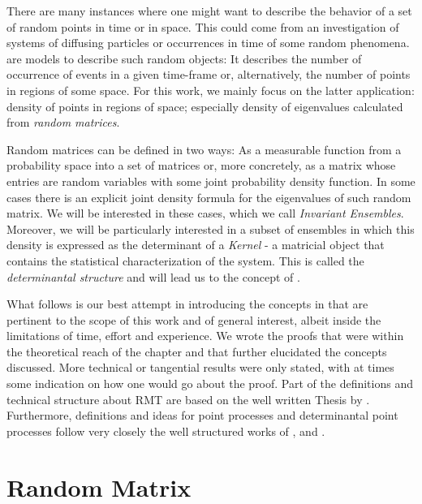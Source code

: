 
There are many instances where one might want to describe the behavior of a set of random points in time or in space. This could come from an investigation of systems of diffusing particles or occurrences in time of some random phenomena.  are models to describe such random objects: It describes the number of occurrence of events in a given time-frame or, alternatively, the number of points in regions of some space. For this work, we mainly focus on the latter application: density of points in regions of space; especially density of eigenvalues calculated from \textit{random matrices}. 

Random matrices can be defined in two ways: As a measurable function from a probability space into a set of matrices or, more concretely, as a matrix whose entries are random variables with some joint probability density function. In some cases there is an explicit joint density formula for the eigenvalues of such random matrix. We will be interested in these cases, which we call \textit{Invariant Ensembles}. Moreover, we will be particularly interested in a subset of ensembles in which this density is expressed as the determinant of a \textit{Kernel} - a matricial object that contains the statistical characterization of the system. This is called the \textit{determinantal structure} and will lead us to the concept of .

What follows is our best attempt in introducing the concepts in  that are pertinent to the scope of this work and of general interest, albeit inside the limitations of time, effort and experience. We wrote the proofs that were within the theoretical reach of the chapter and that further elucidated the concepts discussed. More technical or tangential results were only stated, with at times some indication on how one would go about the proof. Part of the definitions and technical structure about RMT are based on the well written Thesis by . Furthermore, definitions and ideas for point processes and determinantal point processes follow very closely the well structured works of ,  and .

\section{Random Matrix}
\label{Section: RMT}

